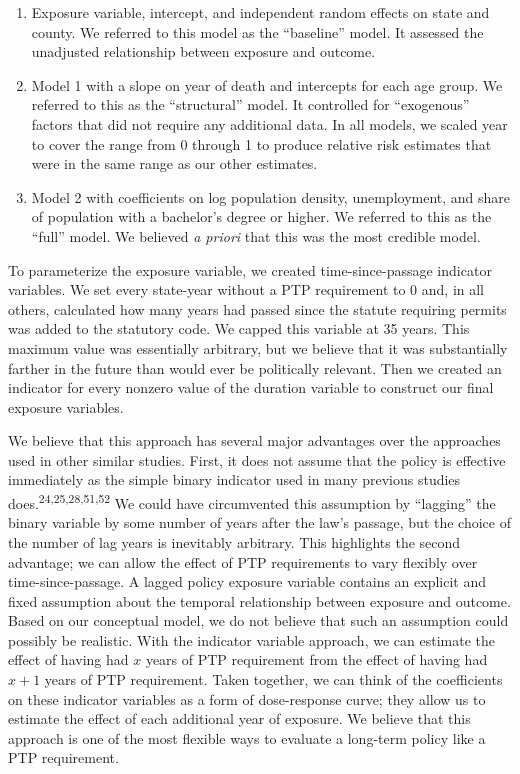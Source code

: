 \documentclass[]{article}
\providecommand{\tightlist}{%
  \setlength{\itemsep}{0pt}\setlength{\parskip}{0pt}}
\begin{document}
\begin{enumerate}
\def\labelenumi{\arabic{enumi}.}
\tightlist
\item
  Exposure variable, intercept, and independent random effects on state
  and county. We referred to this model as the ``baseline'' model. It
  assessed the unadjusted relationship between exposure and outcome.\\
\item
  Model 1 with a slope on year of death and intercepts for each age
  group. We referred to this as the ``structural'' model. It controlled
  for ``exogenous'' factors that did not require any additional data. In
  all models, we scaled year to cover the range from 0 through 1 to
  produce relative risk estimates that were in the same range as our
  other estimates.\\
\item
  Model 2 with coefficients on log population density, unemployment, and
  share of population with a bachelor's degree or higher. We referred to
  this as the ``full'' model. We believed \emph{a priori} that this was
  the most credible model.
\end{enumerate}

To parameterize the exposure variable, we created time-since-passage
indicator variables. We set every state-year without a PTP requirement
to 0 and, in all others, calculated how many years had passed since the
statute requiring permits was added to the statutory code. We capped
this variable at 35 years. This maximum value was essentially arbitrary,
but we believe that it was substantially farther in the future than
would ever be politically relevant. Then we created an indicator for
every nonzero value of the duration variable to construct our final
exposure variables.

We believe that this approach has several major advantages over the
approaches used in other similar studies. First, it does not assume that
the policy is effective immediately as the simple binary indicator used
in many previous studies does.\textsuperscript{24,25,28,51,52} We could
have circumvented this assumption by ``lagging'' the binary variable by
some number of years after the law's passage, but the choice of the
number of lag years is inevitably arbitrary. This highlights the second
advantage; we can allow the effect of PTP requirements to vary flexibly
over time-since-passage. A lagged policy exposure variable contains an
explicit and fixed assumption about the temporal relationship between
exposure and outcome. Based on our conceptual model, we do not believe
that such an assumption could possibly be realistic. With the indicator
variable approach, we can estimate the effect of having had \(x\) years
of PTP requirement from the effect of having had \(x+1\) years of PTP
requirement. Taken together, we can think of the coefficients on these
indicator variables as a form of dose-response curve; they allow us to
estimate the effect of each additional year of exposure. We believe that
this approach is one of the most flexible ways to evaluate a long-term
policy like a PTP requirement.
\end{document}

